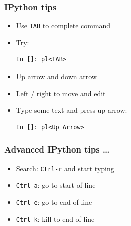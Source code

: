 \documentclass[14pt,compress]{beamer}
\newcommand{\typ}[1]{\lstinline{#1}}
\begin{document}
\begin{frame}[fragile]
\frametitle{IPython tips}

\begin{itemize}
\item Use \typ{TAB} to complete command
\item Try:
\begin{lstlisting}
In []: pl<TAB>
\end{lstlisting}
\end{itemize}
\vspace*{0.5in}

{\Large {}}
\begin{itemize}
\item Up arrow and down arrow

\item Left / right to move and edit

\item Type some text and press up arrow:
\begin{lstlisting}
In []: pl<Up Arrow>
\end{lstlisting}

\end{itemize}

\end{frame}

\begin{frame}[fragile]
  \frametitle{Advanced IPython tips \ldots}
  \begin{itemize}
\item Search: \typ{Ctrl-r} and start typing

\item \typ{Ctrl-a}: go to start of line

\item \typ{Ctrl-e}: go to end of line

\item \typ{Ctrl-k}: kill to end of line
  \end{itemize}
\end{frame}
\end{document}
